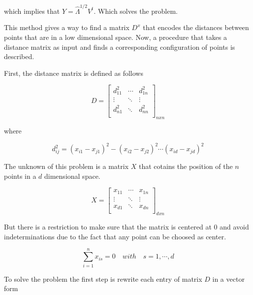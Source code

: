 \documentclass[12pt,journal]{IEEEtran}
\begin{document}
    which implies that $Y = \hat{\Lambda}^{1/2} V^t$. Which solves the problem.

    \vspace{0.25cm}

    This method gives a way to find a matrix $D^x$ that encodes the distances
    between points that are in a low dimensional space. Now, a procedure that
    takes a distance matrix as input and finds a corresponding configuration
    of points is described. 

    \vspace{0.25cm}
    
    First, the distance matrix is defined as follows

    \[
        D =
        \begin{bmatrix}
            d_{11}^2 & \cdots & d_{1n}^2\\
            \vdots   & \ddots & \vdots  \\
            d_{n1}^2 & \ddots & d_{nn}^2\\
        \end{bmatrix}_{n x n}
    \]

    where

    \begin{equation*}
        d_{ij}^2 = (x_{i1}-x_{j1})^2 - (x_{i2}-x_{j2})^2 \cdots (x_{id}-x_{jd})^2
    \end{equation*}

    The unknown of this problem is a matrix $X$ that cotains the position of the
    $n$ points in a $d$ dimensional space.

    \[
        X =
        \begin{bmatrix}
            x_{11} & \cdots & x_{1n}\\
            \vdots & \ddots & \vdots\\
            x_{d1} & \ddots & x_{dn}\\
        \end{bmatrix}_{d x n}
    \]

    But there is a restriction to make sure that the matrix is centered at 0 and
    avoid indeterminations due to the fact that any point can be choosed as center.

    \begin{equation*}
        \sum_{i=1}^n x_{is} = 0 \quad with \quad s = 1, \cdots, d
    \end{equation*}

    To solve the problem the first step is rewrite each entry of matrix $D$ in
    a vector form
\end{document}
